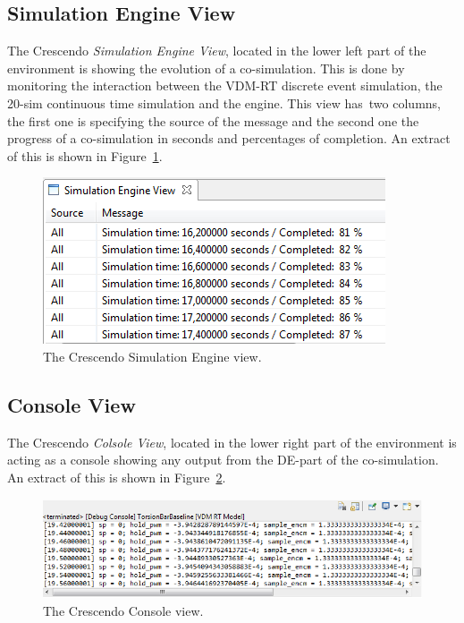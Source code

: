 \documentclass{crescendorepchap}
\begin{document}
\subsection{Simulation Engine View}

The Crescendo \emph{Simulation Engine View}, located in the lower left part of the
environment is showing the evolution of a co-simulation. This is done by
monitoring the interaction between the VDM-RT discrete event simulation,
the 20-sim continuous time simulation and the engine. This view has~two
columns, the first one is specifying the source of the message and the
second one the progress of a co-simulation in seconds and percentages of completion.
An extract of this is shown in Figure~\ref{fig:engineview}.

\begin{figure}[htbp]
\centering
\includegraphics[width=.6\textwidth]{images/DestecsEngineView.png}
\caption{The Crescendo Simulation Engine view.\label{fig:engineview}}
\end{figure}

\subsection{Console View}

The Crescendo \emph{Colsole View}, located in the lower right part of the
environment is acting as a console showing any output from the DE-part of
the co-simulation.
An extract of this is shown in Figure~\ref{fig:consoleview}.

\begin{figure}[htbp]
\centering
\includegraphics[width=.6\textwidth]{images/DestecsConsoleView.png}
\caption{The Crescendo Console view.\label{fig:consoleview}}
\end{figure}

\end{document}
